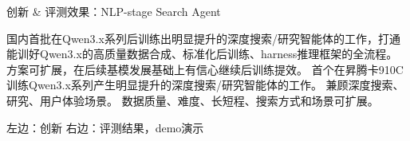 创新 & 评测效果：NLP-stage Search Agent


国内首批在Qwen3.x系列后训练出明显提升的深度搜索/研究智能体的工作，打通能训好Qwen3.x的高质量数据合成、标准化后训练、harness推理框架的全流程。方案可扩展，在后续基模发展基础上有信心继续后训练提效。
首个在昇腾卡910C训练Qwen3.x系列产生明显提升的深度搜索/研究智能体的工作。
兼顾深度搜索、研究、用户体验场景。
数据质量、难度、长短程、搜索方式和场景可扩展。



左边：创新
右边：评测结果，demo演示